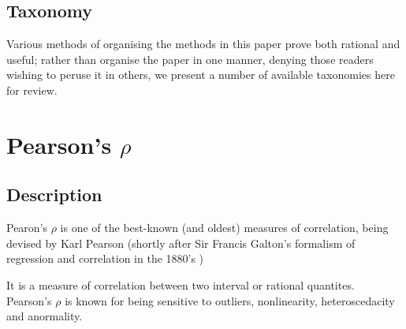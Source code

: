 \documentclass[11pt]{article}
\begin{document}

\subsection{Taxonomy}
Various methods of organising the methods in this paper prove both rational and useful; rather than organise the paper in one manner, denying those readers wishing to peruse it in others, we present a number of available taxonomies here for review.



%
%

\section{Pearson's $\rho$} %
\label{section:pearsonrho}
\subsection{Description}
Pearon's $\rho$ is one of the best-known (and oldest) measures of correlation, being devised by Karl Pearson (shortly after Sir Francis Galton's formalism of regression and correlation in the 1880's \cite{galton1888co}) %

It is a measure of correlation between two interval or rational quantites.  Pearson's $\rho$ is known for being sensitive to outliers, nonlinearity, heteroscedacity and anormality.

\end{document}
